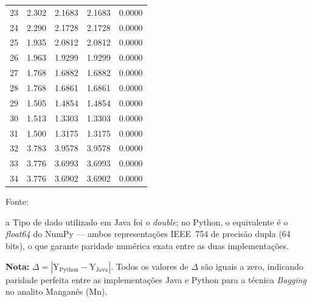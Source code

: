\begin{table}[H]
\begin{threeparttable}
{\begin{tabular}{
    S[table-format=2.0]
    S[table-format=2.3]
    S[table-format=2.4]
    S[table-format=2.4]
    S[table-format=1.4]
}
 23 &   2.302 &   2.1683 &   2.1683 & 0.0000 \\
 24 &   2.290 &   2.1728 &   2.1728 & 0.0000 \\
 25 &   1.935 &   2.0812 &   2.0812 & 0.0000 \\
 26 &   1.963 &   1.9299 &   1.9299 & 0.0000 \\
 27 &   1.768 &   1.6882 &   1.6882 & 0.0000 \\
 28 &   1.768 &   1.6861 &   1.6861 & 0.0000 \\
 29 &   1.505 &   1.4854 &   1.4854 & 0.0000 \\
 30 &   1.513 &   1.3303 &   1.3303 & 0.0000 \\
 31 &   1.500 &   1.3175 &   1.3175 & 0.0000 \\
 32 &   3.783 &   3.9578 &   3.9578 & 0.0000 \\
 33 &   3.776 &   3.6993 &   3.6993 & 0.0000 \\
 34 &   3.776 &   3.6902 &   3.6902 & 0.0000 \\
\bottomrule
\end{tabular}%
}
\begin{center}
\begin{minipage}{0.85\linewidth}
\begin{tablenotes}
\footnotesize
\item Fonte:~\oautor
\item[a] Tipo de dado utilizado em Java foi o \textit{double}; no Python,
o equivalente é o \textit{float64} do NumPy — ambos representações IEEE~754
de precisão dupla (64 bits), o que garante paridade numérica exata entre as
duas implementações.
\item \textbf{Nota:} $\Delta = |\text{Y}_{\text{Python}} - \text{Y}_{\text{Java}}|$.
Todos os valores de $\Delta$ são iguais a zero, indicando paridade
perfeita entre as implementações Java e Python para a técnica \textit{Bagging}
no analito Manganês (Mn).
\end{tablenotes}
\end{minipage}
\end{center}
\end{threeparttable}
\end{table}

